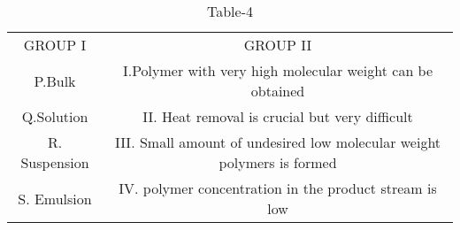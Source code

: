  \begin{table}[H]
      \centering
      \begin{tabular}{c|c}
       GROUP I  & GROUP II \\
       P.Bulk    & I.Polymer with very high molecular weight can be obtained\\
       Q.Solution & II. Heat removal is crucial but very difficult\\
       R. Suspension & III. Small amount of undesired low molecular weight polymers is formed\\
       S. Emulsion & IV. polymer concentration in the product stream is low
      \end{tabular}
      \caption{Table-4}
      \label{tab:tables/table4.tex}
  \end{table}